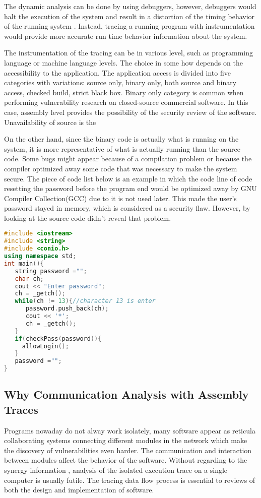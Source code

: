 The dynamic analysis can be done by using debuggers, however, debuggers would halt the execution of the system and result in a distortion of the timing behavior of the running system \cite{trumper2012maintenance}. Instead, tracing a running program with instrumentation would provide more accurate run time behavior information about the system.

The instrumentation of the tracing can be in various level, such as programming language or machine language levels. The choice in some how depends on the accessibility to the application. The application access is divided into five categories with variations: source only, binary only, both source and binary access, checked build, strict black box. Binary only category is common when performing vulnerability research on closed-source commercial software.\cite{dowd_art_2006} In this case, assembly level provides the possibility of the security review of the software. Unavailability of source is the 

On the other hand, since the binary code is actually what is running on the system, it is more representative of what is actually running than the source code.  Some bugs might appear because of a compilation problem or because the compiler optimized away some code that was
necessary to make the system secure. The piece of code list below is an example in which the code line of code resetting the password before the program end would be optimized away by GNU Compiler Collection(GCC) due to it is not used later. This made the user's password stayed in memory, which is considered as a security flaw. However, by looking at the source code didn't reveal that problem.

\begin{lstlisting}[language=C++, caption= Password Fetching Example ]
#include <iostream>
#include <string>
#include <conio.h>
using namespace std;
int main(){
   string password ="";
   char ch;
   cout << "Enter password";
   ch = _getch();
   while(ch != 13){//character 13 is enter
      password.push_back(ch);
      cout << '*';
      ch = _getch();
   }   
   if(checkPass(password)){
     allowLogin();
   }  
   password ="";
}
\end{lstlisting}


\subsection{Why Communication Analysis with Assembly Traces}
Programs nowaday do not alway work isolately,  many software  appear as  reticula collaborating systems connecting different modules in the network\cite{PhysRevE.68.046116} which make the discovery of vulnerabilities even harder. The communication and interaction between modules affect the behavior of the software. Without regarding to the synergy information , analysis of the isolated execution trace on a single computer is usually futile. The tracing data flow process is essential to reviews of both the design and implementation of software.

